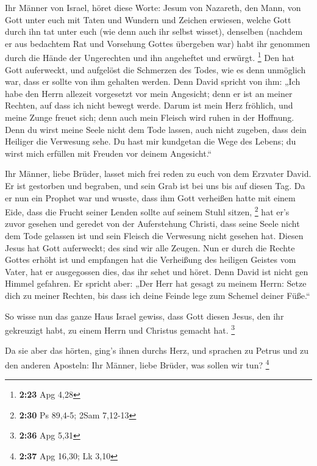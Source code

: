  Ihr Männer von Israel, höret diese Worte: Jesum von
Nazareth, den Mann, von Gott unter euch mit Taten und Wundern und
Zeichen erwiesen, welche Gott durch ihn tat unter euch (wie denn auch
ihr selbst wisset),  denselben (nachdem er aus bedachtem
Rat und Vorsehung Gottes übergeben war) habt ihr genommen durch die
Hände der Ungerechten und ihn angeheftet und erwürgt. \footnote{\textbf{2:23}
  Apg 4,28}  Den hat Gott auferweckt, und aufgelöst die
Schmerzen des Todes, wie es denn unmöglich war, dass er sollte von ihm
gehalten werden.  Denn David spricht von ihm: „Ich habe
den Herrn allezeit vorgesetzt vor mein Angesicht; denn er ist an meiner
Rechten, auf dass ich nicht bewegt werde.  Darum ist mein
Herz fröhlich, und meine Zunge freuet sich; denn auch mein Fleisch wird
ruhen in der Hoffnung.  Denn du wirst meine Seele nicht
dem Tode lassen, auch nicht zugeben, dass dein Heiliger die Verwesung
sehe.  Du hast mir kundgetan die Wege des Lebens; du
wirst mich erfüllen mit Freuden vor deinem Angesicht.``

 Ihr Männer, liebe Brüder, lasset mich frei reden zu euch
von dem Erzvater David. Er ist gestorben und begraben, und sein Grab ist
bei uns bis auf diesen Tag.  Da er nun ein Prophet war
und wusste, dass ihm Gott verheißen hatte mit einem Eide, dass die
Frucht seiner Lenden sollte auf seinem Stuhl sitzen, \footnote{\textbf{2:30}
  Ps 89,4-5; 2Sam 7,12-13}  hat er's zuvor gesehen und
geredet von der Auferstehung Christi, dass seine Seele nicht dem Tode
gelassen ist und sein Fleisch die Verwesung nicht gesehen hat.
 Diesen Jesus hat Gott auferweckt; des sind wir alle
Zeugen.  Nun er durch die Rechte Gottes erhöht ist und
empfangen hat die Verheißung des heiligen Geistes vom Vater, hat er
ausgegossen dies, das ihr sehet und höret.  Denn David
ist nicht gen Himmel gefahren. Er spricht aber: „Der Herr hat gesagt zu
meinem Herrn: Setze dich zu meiner Rechten,  bis dass ich
deine Feinde lege zum Schemel deiner Füße.``

 So wisse nun das ganze Haus Israel gewiss, dass Gott
diesen Jesus, den ihr gekreuzigt habt, zu einem Herrn und Christus
gemacht hat. \footnote{\textbf{2:36} Apg 5,31}

 Da sie aber das hörten, ging's ihnen durchs Herz, und
sprachen zu Petrus und zu den anderen Aposteln: Ihr Männer, liebe
Brüder, was sollen wir tun? \footnote{\textbf{2:37} Apg 16,30; Lk 3,10}


